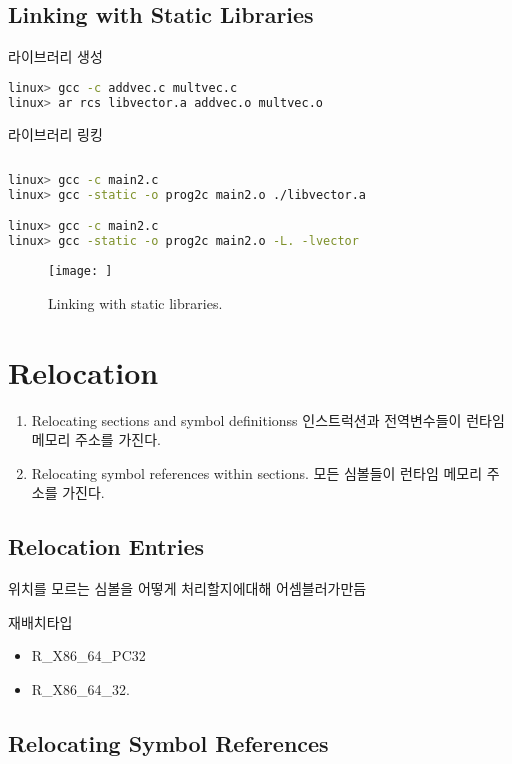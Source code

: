 \subsection{Linking with Static Libraries}

라이브러리 생성

\begin{lstlisting}[language=bash]
linux> gcc -c addvec.c multvec.c
linux> ar rcs libvector.a addvec.o multvec.o
\end{lstlisting}

라이브러리 링킹

\begin{lstlisting}[language=bash]
    
linux> gcc -c main2.c
linux> gcc -static -o prog2c main2.o ./libvector.a

linux> gcc -c main2.c
linux> gcc -static -o prog2c main2.o -L. -lvector

\end{lstlisting}

\begin{figure}[h!]
    \centering
    \texttt{[image: ]}
    \caption{Linking with static libraries.}
\end{figure}




\section{Relocation}

\begin{enumerate}
    \item Relocating sections and symbol definitionss   인스트럭션과 전역변수들이 런타임 메모리 주소를 가진다.
    \item Relocating symbol references within sections.    
    모든 심볼들이 런타임 메모리 주소를 가진다.
\end{enumerate}

\subsection{Relocation Entries}
위치를 모르는 심볼을 어떻게 처리할지에대해 어셈블러가만듬


재배치타입
\begin{itemize}
    \item R_X86_64_PC32
    \item R_X86_64_32.
\end{itemize}
\subsection{Relocating Symbol References}


